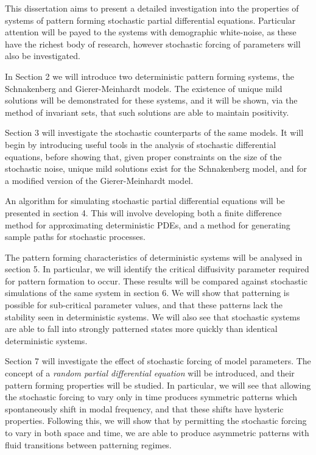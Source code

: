 \documentclass[12pt]{article}
\begin{document}
This dissertation aims to present a detailed investigation into the properties of systems of pattern forming stochastic partial differential equations. Particular attention will be payed to the systems with demographic white-noise, as these have the richest body of research, however stochastic forcing of parameters will also be investigated.

In Section 2 we will introduce two deterministic pattern forming systems, the Schnakenberg and Gierer-Meinhardt models. The existence of unique mild solutions will be demonstrated for these systems, and it will be shown, via the method of invariant sets, that such solutions are able to maintain positivity. 

Section 3 will investigate the stochastic counterparts of the same models. It will begin by introducing useful tools in the analysis of stochastic differential equations, before showing that, given proper constraints on the size of the stochastic noise, unique mild solutions exist for the Schnakenberg model, and for a modified version of the Gierer-Meinhardt model.

An algorithm for simulating stochastic partial differential equations will be presented in section 4. This will involve developing both a finite difference method for approximating deterministic PDEs, and a method for generating sample paths for stochastic processes.  

The pattern forming characteristics of deterministic systems will be analysed in section 5. In particular, we will identify the critical diffusivity parameter required for pattern formation to occur. These results will be compared against stochastic simulations of the same system in section 6. We will show that patterning is possible for sub-critical parameter values, and that these patterns lack the stability seen in deterministic systems. We will also see that stochastic systems are able to fall into strongly patterned states more quickly than identical deterministic systems.

Section 7 will investigate the effect of stochastic forcing of model parameters. The concept of a \textit{random partial differential equation} will be introduced, and their pattern forming properties will be studied. In particular, we will see that allowing the stochastic forcing to vary only in time produces symmetric patterns which spontaneously shift in modal frequency, and that these shifts have hysteric properties. Following this, we will show that by permitting the stochastic forcing to vary in both space and time, we are able to produce asymmetric patterns with fluid transitions between patterning regimes.
\end{document}

